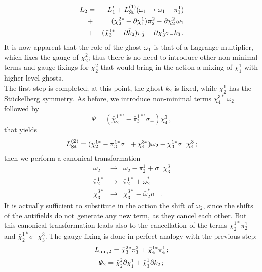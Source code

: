 \documentclass[a4paper,12pt]{article}
\begin{document}
\begin{eqnarray}
  L_2  &= &  L_1' +  L_{\rm St}^{(1)}(\omega_1 \to \omega_1 - \pi_1^1)
  \nonumber \\ 
&+&  ({\bar\chi}_2^{2*} -\partial \bar\chi_1^1 ) \pi_2^2 - \partial
\bar\chi_2^2 \, \omega_1 \\
&+& ({\bar\chi}_3^{1*} -\partial \bar k_2 ) \pi_3^1
   - \partial \chi_3^1 \sigma_- k_3 \, . \nonumber
\end{eqnarray}
It is now apparent that the role of the ghost $\omega_1$ is that of a
Lagrange multiplier, which fixes the gauge of $\chi_2^2$; thus there
is no need to introduce other non-minimal terms and gauge-fixings for
$\chi_2^2$ that would bring in the action a mixing of $\chi_1^1$ with
higher-level ghosts. \\
The first step is completed; at this point, the ghost $k_2$ is fixed,
while $\chi_2^1$ has the St\"uckelberg symmetry. As before, we
introduce non-minimal terms ${\bar\chi}_4^{3*}~\omega_2$ followed by 
\begin{displaymath}
\Psi =
({\bar\chi}_2^{{1*}'} - {\bar\pi}_3^{{1*}'} \sigma_-) \chi_4^3 \, ,  
\end{displaymath}
that yields
\begin{equation}
L_{\rm St}^{(2)} = ({\bar\chi}_2^{1*}  - {\bar\pi}_3^{1*} \sigma_-  
+ {\bar\chi}_4^{3*}) \omega_2 + {\bar\chi}_3^{1*} \sigma_-
\chi_4^3 \, ;
\end{equation}
then we perform a canonical transformation 
\begin{eqnarray}
  \omega_2 & \to & \omega_2 - \pi_2^1 + \sigma_- \chi_3^3 \nonumber \\
  {\bar \pi}_2^{1*} & \to & {\bar \pi}_2^{1*} + {\bar\omega}_2^* \\
  {\bar\chi}_3^{3*} &\to & {\bar\chi}_3^{3*} - {\bar \omega}_2^* 
  \sigma_-  \, . \nonumber
\end{eqnarray}
It is actually sufficient to substitute in the action the shift of
$\omega_2$, since the shifts of the antifields do not generate any new
term, as they cancel each other. But this canonical transformation leads
also to the cancellation of the terms ${\bar\chi}_2^{1*} \pi_2^1$ and
${\bar\chi}_2^{1*} \sigma_- \chi_3^3$. The gauge-fixing is done in
perfect analogy with the previous step:
\begin{equation}
  L_{\rm nm,2} = {\bar\chi}_3^{2*} \pi_3^2 + {\bar\chi}_4^{1*} \pi_4^1 \, 
  ;
\end{equation}
\begin{displaymath}
  \Psi_2 = \bar\chi_2^2 \partial \chi_1^1 + \bar\chi_3^1 \partial k_2 
  \, ;
\end{displaymath}
\end{document}
